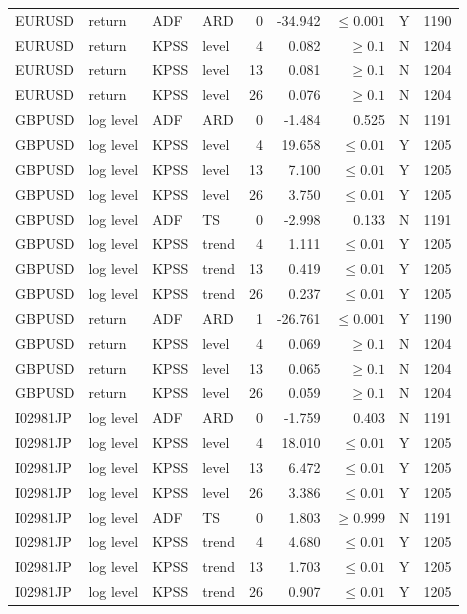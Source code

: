 {\begin{longtable}{@{}llllrrrrr@{}}
EURUSD & return & ADF & ARD & 0 & -34.942 & $\leq 0.001$ & Y & 1190\\
EURUSD & return & KPSS & level & 4 & 0.082 & $\geq 0.1$ & N & 1204\\
EURUSD & return & KPSS & level & 13 & 0.081 & $\geq 0.1$ & N & 1204\\
EURUSD & return & KPSS & level & 26 & 0.076 & $\geq 0.1$ & N & 1204\\
GBPUSD & log level & ADF & ARD & 0 & -1.484 & 0.525 & N & 1191\\
GBPUSD & log level & KPSS & level & 4 & 19.658 & $\leq 0.01$ & Y & 1205\\
GBPUSD & log level & KPSS & level & 13 & 7.100 & $\leq 0.01$ & Y & 1205\\
GBPUSD & log level & KPSS & level & 26 & 3.750 & $\leq 0.01$ & Y & 1205\\
GBPUSD & log level & ADF & TS & 0 & -2.998 & 0.133 & N & 1191\\
GBPUSD & log level & KPSS & trend & 4 & 1.111 & $\leq 0.01$ & Y & 1205\\
GBPUSD & log level & KPSS & trend & 13 & 0.419 & $\leq 0.01$ & Y & 1205\\
GBPUSD & log level & KPSS & trend & 26 & 0.237 & $\leq 0.01$ & Y & 1205\\
GBPUSD & return & ADF & ARD & 1 & -26.761 & $\leq 0.001$ & Y & 1190\\
GBPUSD & return & KPSS & level & 4 & 0.069 & $\geq 0.1$ & N & 1204\\
GBPUSD & return & KPSS & level & 13 & 0.065 & $\geq 0.1$ & N & 1204\\
GBPUSD & return & KPSS & level & 26 & 0.059 & $\geq 0.1$ & N & 1204\\
I02981JP & log level & ADF & ARD & 0 & -1.759 & 0.403 & N & 1191\\
I02981JP & log level & KPSS & level & 4 & 18.010 & $\leq 0.01$ & Y & 1205\\
I02981JP & log level & KPSS & level & 13 & 6.472 & $\leq 0.01$ & Y & 1205\\
I02981JP & log level & KPSS & level & 26 & 3.386 & $\leq 0.01$ & Y & 1205\\
I02981JP & log level & ADF & TS & 0 & 1.803 & $\geq 0.999$ & N & 1191\\
I02981JP & log level & KPSS & trend & 4 & 4.680 & $\leq 0.01$ & Y & 1205\\
I02981JP & log level & KPSS & trend & 13 & 1.703 & $\leq 0.01$ & Y & 1205\\
I02981JP & log level & KPSS & trend & 26 & 0.907 & $\leq 0.01$ & Y & 1205\\

\end{longtable}}
